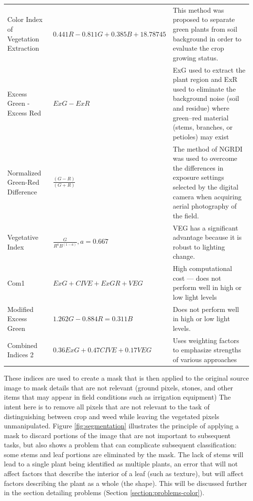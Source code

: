 \documentclass[letterpaper]{report}
\begin{document}
{{\begin{longtable}{x{\dimexpr.25\tabcolsep}
                  x{\dimexpr.35\tabcolsep}
                  x{\dimexpr.4\tabcolsep}}
		Color Index of Vegetation Extraction      
		& $0.441 R - 0.811 G + 0.385 B + 18.78745$
		& This method was proposed to separate green plants from soil background in order to evaluate the crop growing status.
\tabularnewline\addlinespace

		Excess Green - Excess Red   
		& $ExG - ExR$ 
		& ExG used to extract the plant region and ExR used to eliminate the background noise (soil and residue) where green–red material (stems, branches, or petioles) may exist
\tabularnewline\addlinespace

		Normalized Green-Red Difference    
		& $\frac {(G - R)} {(G + R)}$ 
		& The method of NGRDI was used to overcome the differences in exposure settings selected by the digital camera when acquiring aerial photography of the field. 
\tabularnewline\addlinespace

		Vegetative Index      
		& $\frac {G} {R^aB^{(1-a)}}, a = 0.667$ 
		& VEG has a significant advantage because it is robust to lighting change.
\tabularnewline\addlinespace

		Com1   
		& $ExG + CIVE + ExGR + VEG$ 
		& High computational cost --- does not perform well in high or low light levels
\tabularnewline\addlinespace

		Modified Excess Green      
		& $1.262G - 0.884R = 0.311B$ 
		& Does not perform well in high or low light levels. 
\tabularnewline\addlinespace

		Combined Indices 2      
		& $0.36ExG + 0.47CIVE + 0.17VEG$ 
		& Uses weighting factors to emphasize strengths of various approaches
\label{table:indices}
\end{longtable}
}

These indices are used to create a mask that is then applied to the original source image to mask details that are not relevant (ground pixels, stones, and other items that may appear in field conditions such as irrigation equipment) The intent here is to remove all pixels that are not relevant to the task of distinguishing between crop and weed while leaving the vegetated pixels unmanipulated.  Figure \ref{fig:segmentation} illustrates the principle of applying a mask to discard portions of the image that are not important to subsequent tasks, but also shows a problem that can complicate subsequent classification: some stems and leaf portions are eliminated by the mask. The lack of stems will lead to a single plant being identified as multiple plants, an error that will not affect factors that describe the interior of a leaf (such as texture), but will affect factors describing the plant as a whole (the shape). This will be discussed further in the section detailing problems (Section \ref{section:problems-color}).

}
\end{document}
